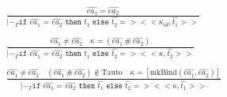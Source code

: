 \documentclass[10pt]{../sigplanconf}
\newcommand{\nfrac}[2]{\frac{\displaystyle{#1}}{\displaystyle{#2}}}
\newcommand{\tagsc}[1]{\tag{\scshape #1}}
\begin{document}
\begin{figure*}
  \begin{align}
    \nfrac{
      \widehat{ea_1} = \widehat{ea_2}
    }{
      |-_\Gamma \texttt{if $\widehat{ea_1}$ = $\widehat{ea_2}$ then $\widehat{t_1}$ else $\widehat{t_2}$} => <<\kappa_{id},\widehat{t_1}>>
    } \tagsc{If-Eq}
\\\nonumber\\
    \nfrac{
      \widehat{ea_1} \neq \widehat{ea_2} \quad \kappa = (\widehat{ea_1}\ \#\ \widehat{ea_2})
    }{
      |-_\Gamma \texttt{if $\widehat{ea_1}$ = $\widehat{ea_2}$ then $\widehat{t_1}$ else $\widehat{t_2}$} => <<\kappa, \widehat{t_2}>>
    } \tagsc{If-Neq-False}
\\\nonumber\\
    \nfrac{
      \widehat{ea_1} \neq \widehat{ea_2} \quad (\widehat{ea_1}\ \#\ \widehat{ea_2}) \not \in \textrm{Tauto} \quad \kappa = [\textrm{mkBind}(\widehat{ea_1}, \widehat{ea_2})]
    }{
      |-_\Gamma \texttt{if $\widehat{ea_1}$ = $\widehat{ea_2}$ then $\widehat{t_1}$ else $\widehat{t_2}$} => <<\kappa, \widehat{t_1}>>
    } \tagsc{If-Neq-True}
  \end{align}

  ~\newline


\end{figure*}
\end{document}
